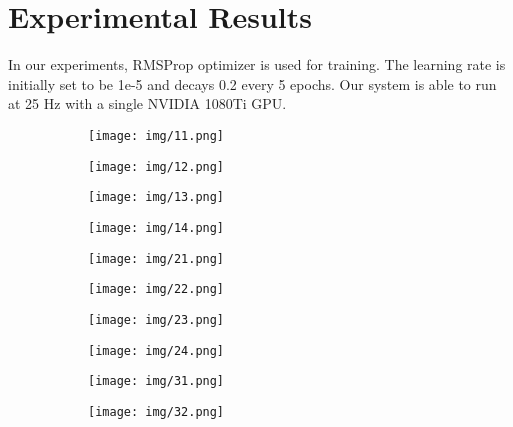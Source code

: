 \documentclass[10pt,twocolumn,letterpaper]{article}
\begin{document}
\section{Experimental Results}
\label{sec:exp}
 
In our experiments, RMSProp optimizer is used for training. The learning rate is initially set to be 1e-5 and decays 0.2 every 5 epochs. Our system is able to run at 25 Hz with a single NVIDIA 1080Ti GPU. 


\begin{figure}
    \centering
    \begin{subfigure}[b]{0.11\textwidth}
        \centering
        \texttt{[image: img/11.png]}
    \end{subfigure}
   \begin{subfigure}[b]{0.11\textwidth}
   \centering
        \texttt{[image: img/12.png]}
    \end{subfigure}
    \begin{subfigure}[b]{0.11\textwidth}
    \centering
        \texttt{[image: img/13.png]}
    \end{subfigure}
    \begin{subfigure}[b]{0.11\textwidth}
    \centering
        \texttt{[image: img/14.png]}
    \end{subfigure}
    \centering
    \begin{subfigure}[b]{0.11\textwidth}
        \centering
        \texttt{[image: img/21.png]}
    \end{subfigure}
   \begin{subfigure}[b]{0.11\textwidth}
   \centering
        \texttt{[image: img/22.png]}
    \end{subfigure}
    \begin{subfigure}[b]{0.11\textwidth}
    \centering
        \texttt{[image: img/23.png]}
    \end{subfigure}
    \begin{subfigure}[b]{0.11\textwidth}
    \centering
        \texttt{[image: img/24.png]}
    \end{subfigure}
    \centering
    \begin{subfigure}[b]{0.11\textwidth}
        \centering
        \texttt{[image: img/31.png]}
    \end{subfigure}
   \begin{subfigure}[b]{0.11\textwidth}
   \centering
        \texttt{[image: img/32.png]}

\end{subfigure}
\end{figure}
\end{document}
